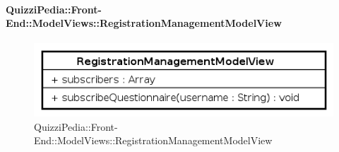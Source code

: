 \paragraph{QuizziPedia::Front-End::ModelViews::RegistrationManagementModelView}
	
	\label{QuizziPedia::Front-End::ModelViews::RegistrationManagementModelView}
	
	\begin{figure}[ht]
		\centering
		\includegraphics[scale=0.5,keepaspectratio]{UML/Classi/Front-End/QuizziPedia_Front-end_ModelView_RegistrationManagementModelView.png}
		\caption{QuizziPedia::Front-End::ModelViews::RegistrationManagementModelView}
	\end{figure} \FloatBarrier
	
